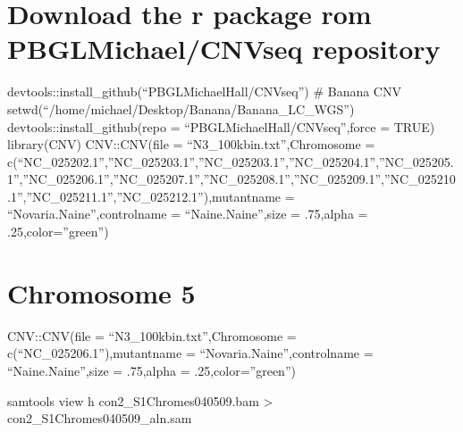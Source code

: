 \documentclass[letterpaper,10pt,english]{sphinxhowto}
\begin{document}
\section{Download the r package rom PBGLMichael/CNVseq repository}
\label{\detokenize{CNV:download-the-r-package-rom-pbglmichael-cnvseq-repository}}
\sphinxAtStartPar
devtools::install\_github(“PBGLMichaelHall/CNVseq”)
\# Banana CNV
setwd(“/home/michael/Desktop/Banana/Banana\_LC\_WGS”)
devtools::install\_github(repo = “PBGLMichaelHall/CNVseq”,force = TRUE)
library(CNV)
CNV::CNV(file = “N3\_100kbin.txt”,Chromosome =  c(“NC\_025202.1”,”NC\_025203.1”,”NC\_025203.1”,”NC\_025204.1”,”NC\_025205.1”,”NC\_025206.1”,”NC\_025207.1”,”NC\_025208.1”,”NC\_025209.1”,”NC\_025210.1”,”NC\_025211.1”,”NC\_025212.1”),mutantname = “Novaria.Naine”,controlname = “Naine.Naine”,size = .75,alpha = .25,color=”green”)

\begin{figure}[htbp]
\centering

\noindent{}
\end{figure}


\section{Chromosome 5}
\label{\detokenize{CNV:chromosome-5}}
\sphinxAtStartPar
CNV::CNV(file = “N3\_100kbin.txt”,Chromosome =  c(“NC\_025206.1”),mutantname = “Novaria.Naine”,controlname = “Naine.Naine”,size = .75,alpha = .25,color=”green”)

\begin{figure}[htbp]
\centering

\noindent{}
\end{figure}

\sphinxAtStartPar
{}

\sphinxAtStartPar
{}

\sphinxAtStartPar
{}

\sphinxAtStartPar
samtools view \sphinxhyphen{}h con\sphinxhyphen{}2\_S1\sphinxhyphen{}Chromes\sphinxhyphen{}04\sphinxhyphen{}05\sphinxhyphen{}09.bam \textgreater{} con\sphinxhyphen{}2\_S1\sphinxhyphen{}Chromes\sphinxhyphen{}04\sphinxhyphen{}05\sphinxhyphen{}09\_aln.sam

\sphinxAtStartPar
{}
\end{document}

